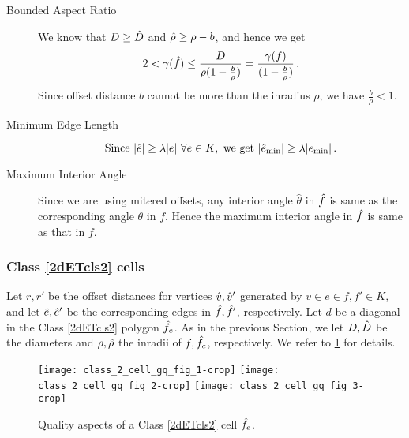 \begin{description}
\item[Bounded Aspect Ratio]\label{bas:2dETcls1}
We know that $D \geq \hat{D}$ and $\hat{\rho} \geq \rho - b$, and hence we get 
\begin{equation} \label{eq:2dETcls1ar}
    2 < \gamma(\hat{f}) \leq \frac{D}{\rho(1 - \frac{b}{\rho})} =\frac{\gamma(f)}{(1 - \frac{b}{\rho})}  \,.
\end{equation}
Since offset distance $b$ cannot be more than the inradius $\rho$, we have  $\frac{b}{\rho} < 1$. 
\item[Minimum Edge Length]\label{mel:2dETcls1}
\begin{equation}
    \mbox{Since } |\hat{e}| \geq \lambda |e| ~\forall e \in K, \mbox{ we get } |\hat{e}_{\min}| \geq \lambda |e_{\min}| \,.
\end{equation}
\item[Maximum Interior Angle]\label{mia:2dETcls1}
  Since we are using mitered offsets, any interior angle  $\hat{\theta}$ in $\hat{f}$ is same as the corresponding angle $\theta$ in $f$.
  Hence the maximum interior angle in $\hat{f}$ is same as that in $f$.  
\end{description}

\subsubsection{Class \ref{2dETcls2} cells} \label{sssec:2dETcls2gq}
Let $r, r'$ be the offset distances for vertices $\hat{v}, \hat{v}'$ generated by $v \in e \in f, f' \in K$, and let $\hat{e}, \hat{e}'$ be the corresponding edges in $\hat{f}, \hat{f}'$, respectively.
Let $d$ be a diagonal in the Class \ref{2dETcls2} polygon $\hat{f}_e$.
As in the previous Section, we let $D, \hat{D}$ be the diameters and $\rho, \hat{\rho}$ the inradii of $f, \hat{f}_e$, respectively.
We refer to \cref{fig:2dETcls2gq} for details.
\begin{figure}[htp!]
      \centering
      \texttt{[image: class\_2\_cell\_gq\_fig\_1-crop]}
      \quad\quad
      \texttt{[image: class\_2\_cell\_gq\_fig\_2-crop]}
      \quad\quad
      \texttt{[image: class\_2\_cell\_gq\_fig\_3-crop]}
      \caption{Quality aspects of a Class \ref{2dETcls2} cell $\hat{f}_e$.
      }
      \label{fig:2dETcls2gq}
\end{figure}

